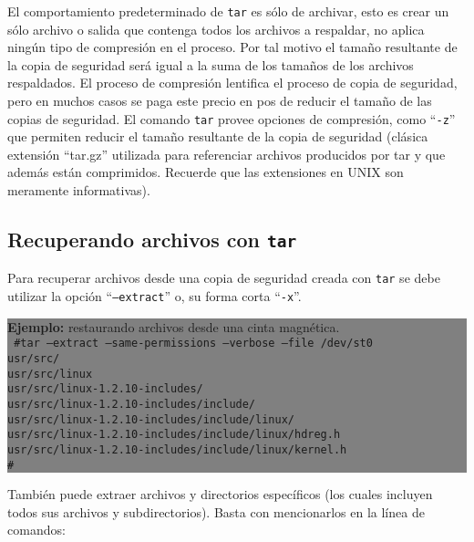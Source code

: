 \documentclass[12pt]{article}
\begin{document}
El comportamiento predeterminado de \texttt{tar} es sólo de archivar, esto
es crear un sólo archivo o salida que contenga todos los archivos a
respaldar, no aplica ningún tipo de compresión en el proceso. Por tal motivo
el tamaño resultante de la copia de seguridad será igual a la suma de los 
tamaños de los archivos respaldados. El proceso de compresión lentifica el 
proceso de copia de seguridad, pero en muchos casos se paga este precio en 
pos de reducir el tamaño de las copias de seguridad. El comando {\tt tar} provee
opciones de compresión, como ``{\tt -z}'' que permiten reducir el tamaño 
resultante de la copia de seguridad (clásica extensión ``tar.gz'' utilizada
para referenciar archivos producidos por tar y que además están comprimidos.
Recuerde que las extensiones en UNIX son meramente informativas). 

\subsection*{ Recuperando archivos con \texttt{\textbf{tar}}}

Para recuperar archivos desde una copia de seguridad creada con {\tt tar} se
debe utilizar la opción ``{\tt --extract}'' o, su forma corta ``{\tt -x}''. 

\colorbox{grey}{\parbox[t]{0.95\linewidth}{ \vspace*{0.5cm} { 
{\bf Ejemplo:} restaurando archivos desde una cinta magnética. \\
{\tt
\#tar --extract --same-permissions --verbose --file /dev/st0\\
usr/src/\\
usr/src/linux\\
usr/src/linux-1.2.10-includes/\\
usr/src/linux-1.2.10-includes/include/\\
usr/src/linux-1.2.10-includes/include/linux/\\
usr/src/linux-1.2.10-includes/include/linux/hdreg.h\\
usr/src/linux-1.2.10-includes/include/linux/kernel.h\\
\#\\
}
} \vspace*{0.5cm} } } 

También puede extraer archivos y directorios específicos (los cuales 
incluyen todos sus archivos y subdirectorios). Basta con mencionarlos en 
la línea de comandos:
\end{document}
